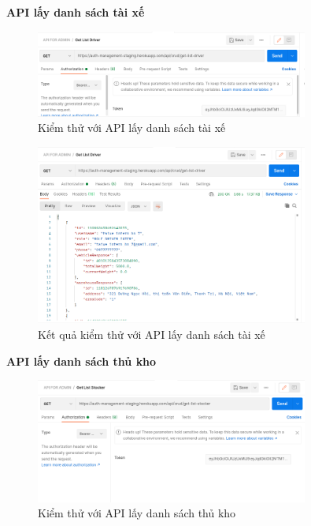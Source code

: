 		\newpage
		
		\textbf{API lấy danh sách tài xế}
		
		\begin{figure}[!ht]
			\includegraphics[width=0.8\textwidth]{Images/testing/API-get-list-drivers.png}
			\centering
			\linebreak
			\caption{Kiểm thử với API lấy danh sách tài xế}
		\end{figure}
		
		\begin{figure}[!ht]
			\includegraphics[width=0.8\textwidth]{Images/testing/API-get-list-drivers-result.png}
			\centering
			\linebreak
			\caption{Kết quả kiểm thử với API lấy danh sách tài xế}
		\end{figure}
		
		\newpage
		
		\textbf{API lấy danh sách thủ kho}
		
		\begin{figure}[!ht]
			\includegraphics[width=0.8\textwidth]{Images/testing/API-get-list-stocker.png}
			\centering
			\linebreak
			\caption{Kiểm thử với API lấy danh sách thủ kho}
		\end{figure}
		
